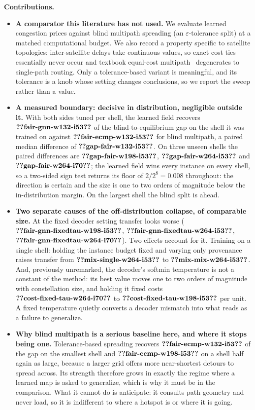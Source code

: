 \documentclass[journal]{IEEEtran}
\begin{document}
\textbf{Contributions.}
\begin{itemize}
\item \textbf{A comparator this literature has not used.} We evaluate learned congestion prices
against blind multipath spreading (an $\varepsilon$-tolerance split) at a matched computational budget. We also record a
property specific to satellite topologies: inter-satellite delays take continuous values, so
exact cost ties essentially never occur and textbook equal-cost multipath~\cite{ecmp}
degenerates to single-path routing. Only a tolerance-based variant is meaningful, and its
tolerance is a knob whose setting changes conclusions, so we report the sweep rather than a
value.

\item \textbf{A measured boundary: decisive in distribution, negligible outside it.} With both sides tuned per shell, the learned field recovers $\clm{fair-gnn-w132-i53}$ of the blind-to-equilibrium gap on the shell it was trained on against $\clm{fair-ecmp-w132-i53}$ for blind multipath, a paired median difference of $\clm{gap-fair-w132-i53}$. On three unseen shells the paired differences are $\clm{gap-fair-w198-i53}$, $\clm{gap-fair-w264-i53}$ and $\clm{gap-fair-w264-i70}$; the learned field wins every instance on every shell, so a two-sided sign test returns its floor of $2/2^{8}=0.008$ throughout: the direction is certain and the size is one to two orders of magnitude below the in-distribution margin. On the largest shell the blind split is ahead.

\item \textbf{Two separate causes of the off-distribution collapse, of comparable size.} At the fixed decoder setting transfer looks worse ($\clm{fair-gnn-fixedtau-w198-i53}$, $\clm{fair-gnn-fixedtau-w264-i53}$, $\clm{fair-gnn-fixedtau-w264-i70}$). Two effects account for it. Training on a single shell: holding the instance budget fixed and varying only provenance raises transfer from $\clm{mix-single-w264-i53}$ to $\clm{mix-mix-w264-i53}$. And, previously unremarked, the decoder's softmin temperature is not a constant of the method: its best value moves one to two orders of magnitude with constellation size, and holding it fixed costs $\clm{cost-fixed-tau-w264-i70}$ to $\clm{cost-fixed-tau-w198-i53}$ per unit. A fixed temperature quietly converts a decoder mismatch into what reads as a failure to generalize.

\item \textbf{Why blind multipath is a serious baseline here, and where it stops being one.}
Tolerance-based spreading recovers $\clm{fair-ecmp-w132-i53}$ of the gap on the smallest shell and $\clm{fair-ecmp-w198-i53}$ on a
shell half again as large, because a larger grid offers more near-shortest detours to spread
across. Its strength therefore grows in exactly the regime where a learned map is asked to
generalize, which is why it must be in the comparison. What it cannot do is anticipate: it
consults path geometry and never load, so it is indifferent to where a hotspot is or where it is
going.


\end{itemize}
\end{document}

